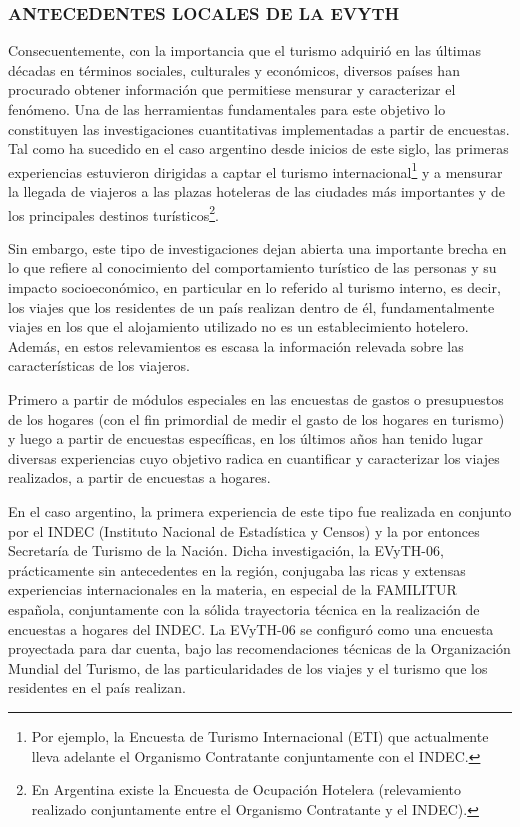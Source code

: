 \documentclass[
  openany]{book}
\begin{document}
\hypertarget{antecedentes-locales-de-la-evyth}{%
\subsubsection{\texorpdfstring{\textbf{ANTECEDENTES LOCALES DE LA EVYTH}}{ANTECEDENTES LOCALES DE LA EVYTH}}\label{antecedentes-locales-de-la-evyth}}

Consecuentemente, con la importancia que el turismo adquirió en las
últimas décadas en términos sociales, culturales y económicos, diversos
países han procurado obtener información que permitiese mensurar y
caracterizar el fenómeno. Una de las herramientas fundamentales para
este objetivo lo constituyen las investigaciones cuantitativas
implementadas a partir de encuestas. Tal como ha sucedido en el caso
argentino desde inicios de este siglo, las primeras experiencias
estuvieron dirigidas a captar el turismo internacional\footnote{Por ejemplo, la Encuesta de Turismo Internacional (ETI)
  que actualmente lleva adelante el Organismo Contratante
  conjuntamente con el INDEC.} y a
mensurar la llegada de viajeros a las plazas hoteleras de las ciudades
más importantes y de los principales destinos turísticos\footnote{En Argentina existe la Encuesta de Ocupación Hotelera
  (relevamiento realizado conjuntamente entre el Organismo Contratante
  y el INDEC).}.

Sin embargo, este tipo de investigaciones dejan abierta una importante
brecha en lo que refiere al conocimiento del comportamiento turístico de
las personas y su impacto socioeconómico, en particular en lo referido
al turismo interno, es decir, los viajes que los residentes de un país
realizan dentro de él, fundamentalmente viajes en los que el alojamiento
utilizado no es un establecimiento hotelero. Además, en estos
relevamientos es escasa la información relevada sobre las
características de los viajeros.

Primero a partir de módulos especiales en las encuestas de gastos o
presupuestos de los hogares (con el fin primordial de medir el gasto de
los hogares en turismo) y luego a partir de encuestas específicas, en
los últimos años han tenido lugar diversas experiencias cuyo objetivo
radica en cuantificar y caracterizar los viajes realizados, a partir de
encuestas a hogares.

En el caso argentino, la primera experiencia de este tipo fue realizada
en conjunto por el INDEC (Instituto Nacional de Estadística y Censos) y
la por entonces Secretaría de Turismo de la Nación. Dicha investigación,
la EVyTH-06, prácticamente sin antecedentes en la región, conjugaba las
ricas y extensas experiencias internacionales en la materia, en especial
de la FAMILITUR española, conjuntamente con la sólida trayectoria
técnica en la realización de encuestas a hogares del INDEC. La EVyTH-06
se configuró como una encuesta proyectada para dar cuenta, bajo las
recomendaciones técnicas de la Organización Mundial del Turismo, de las
particularidades de los viajes y el turismo que los residentes en el
país realizan.
\end{document}
